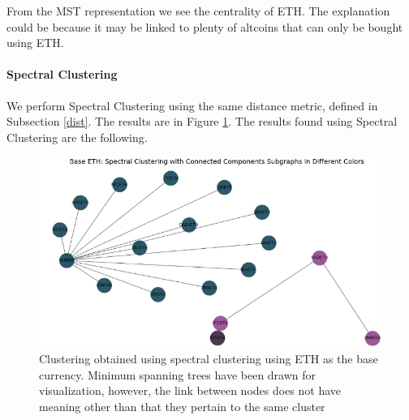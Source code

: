 \documentclass[a4paper]{article}
\begin{document}
\begin{multicols}{2}
From the MST representation we see the centrality of ETH. The explanation could be because it may be linked to plenty of altcoins that can only be bought using ETH.


\paragraph{Spectral Clustering}
We perform Spectral Clustering using the same distance metric, defined in Subsection \ref{dist}. The results are in Figure \ref{fig:spectralclust_Crypto}.
The results found using Spectral Clustering are the following.

\end{multicols}
\begin{figure}[H]
\centering
    \includegraphics[totalheight=8cm]{spectral_crypto_cropped.PNG}
    \caption{Clustering obtained using spectral clustering using ETH as the base currency. Minimum spanning trees have been drawn for visualization, however, the link between nodes does not have meaning other than that they pertain to the same cluster}
    \label{fig:spectralclust_Crypto}
\end{figure}
\end{document}

